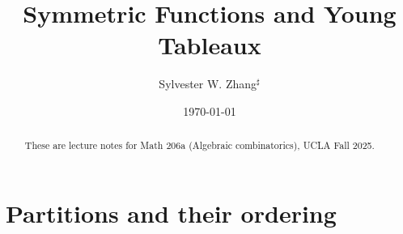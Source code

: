 \documentclass{amsart}
\title{Symmetric Functions and Young Tableaux}
\author{Sylvester W. Zhang$^\sharp$}
\date{\today}
\theoremstyle{plain}
\theoremstyle{definition}
\begin{document}
\maketitle

\begin{abstract}
	These are lecture notes for Math 206a (Algebraic combinatorics), UCLA Fall 2025.
\end{abstract}
\tableofcontents
\section{Partitions and their ordering}


	
\end{document}
